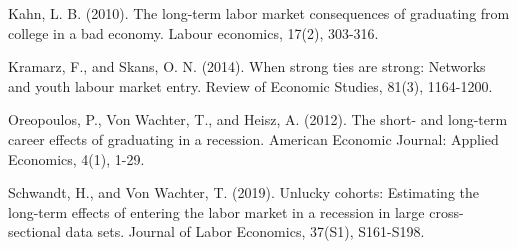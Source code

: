 \documentclass[12pt]{article}
\begin{document}
Kahn, L. B. (2010). The long-term labor market consequences of graduating from college in a bad economy. Labour economics, 17(2), 303-316.

Kramarz, F., and Skans, O. N. (2014). When strong ties are strong: Networks and youth labour market entry. Review of Economic Studies, 81(3), 1164-1200.  



Oreopoulos, P., Von Wachter, T., and Heisz, A. (2012). The short- and long-term career effects of  graduating in a recession. American Economic Journal: Applied Economics, 4(1), 1-29.


Schwandt, H., and Von Wachter, T. (2019). Unlucky cohorts: Estimating the long-term effects of entering the labor market in a recession in large cross-sectional data sets. Journal of Labor Economics, 37(S1), S161-S198.
\end{document}
